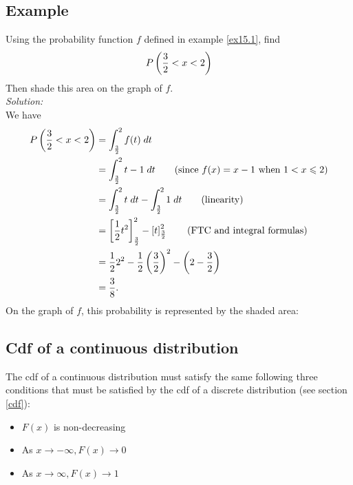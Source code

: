  
\subsection{Example}
Using the probability function $f$ defined in example \ref{ex15.1}, find
\[
P\left(\frac{3}{2} < x < 2\right)
\]
Then shade this area on the graph of $f$. \\

\noindent \textit{Solution:} \\
We have
\begin{align*}
P\brac{\frac{3}{2} < x < 2}  & = \int_\frac{3}{2}^2 f(t) \; dt \\
	& = \int_\frac{3}{2}^2 t-1 \; dt \tag{since $f(x) = x-1$ when $1 < x \leq 2$} \\
	& = \int_\frac{3}{2}^2 t \; dt - \int_\frac{3}{2}^2 1 \; dt \tag{linearity} \\
	& = \squac{\frac{1}{2}t^2}_\frac{3}{2}^2 - \squac{t}_\frac{3}{2}^2 \tag{FTC and integral formulas} \\
	& = \frac{1}{2}2^2 - \frac{1}{2}\brac{\frac{3}{2}}^2 - \brac{2 - \frac{3}{2}} \\
	& = \frac{3}{8}.
\end{align*}
On the graph of $f$, this probability is represented by the shaded area:
\begin{center}
\end{center}

\subsection{Cdf of a continuous distribution} \label{cdf(continuous)}
\noindent The cdf of a continuous distribution must satisfy the same following three conditions that must be satisfied by the cdf of a discrete distribution (see section \ref{cdf}):
\begin{itemize}
\item $F(x)$ is non-decreasing
\item As $x \rightarrow -\infty, F(x) \rightarrow 0$
\item As $x \rightarrow \infty, F(x) \rightarrow 1$
\end{itemize}

